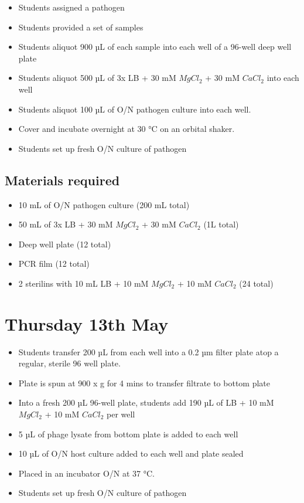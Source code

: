 \documentclass[
]{book}
\providecommand{\tightlist}{%
  \setlength{\itemsep}{0pt}\setlength{\parskip}{0pt}}
\begin{document}
\begin{itemize}
\tightlist
\item
  Students assigned a pathogen
\item
  Students provided a set of samples
\item
  Students aliquot 900 µL of each sample into each well of a 96-well deep well plate
\item
  Students aliquot 500 µL of 3x LB + 30 mM \(MgCl_{2}\) + 30 mM \(CaCl_{2}\) into each well
\item
  Students aliquot 100 µL of O/N pathogen culture into each well.
\item
  Cover and incubate overnight at 30 °C on an orbital shaker.
\item
  Students set up fresh O/N culture of pathogen
\end{itemize}

\hypertarget{materials-required-2}{%
\subsection{Materials required}\label{materials-required-2}}

\begin{itemize}
\tightlist
\item
  10 mL of O/N pathogen culture (200 mL total)
\item
  50 mL of 3x LB + 30 mM \(MgCl_{2}\) + 30 mM \(CaCl_{2}\) (1L total)
\item
  Deep well plate (12 total)
\item
  PCR film (12 total)
\item
  2 sterilins with 10 mL LB + 10 mM \(MgCl_{2}\) + 10 mM \(CaCl_{2}\) (24 total)
\end{itemize}

\hypertarget{thursday-13th-may}{%
\section{Thursday 13th May}\label{thursday-13th-may}}

\begin{itemize}
\tightlist
\item
  Students transfer 200 µL from each well into a 0.2 µm filter plate atop a regular, sterile 96 well plate.
\item
  Plate is spun at 900 x g for 4 mins to transfer filtrate to bottom plate
\item
  Into a fresh 200 µL 96-well plate, students add 190 µL of LB + 10 mM \(MgCl_{2}\) + 10 mM \(CaCl_{2}\) per well
\item
  5 µL of phage lysate from bottom plate is added to each well
\item
  10 µL of O/N host culture added to each well and plate sealed
\item
  Placed in an incubator O/N at 37 °C.
\item
  Students set up fresh O/N culture of pathogen
\end{itemize}
\end{document}
